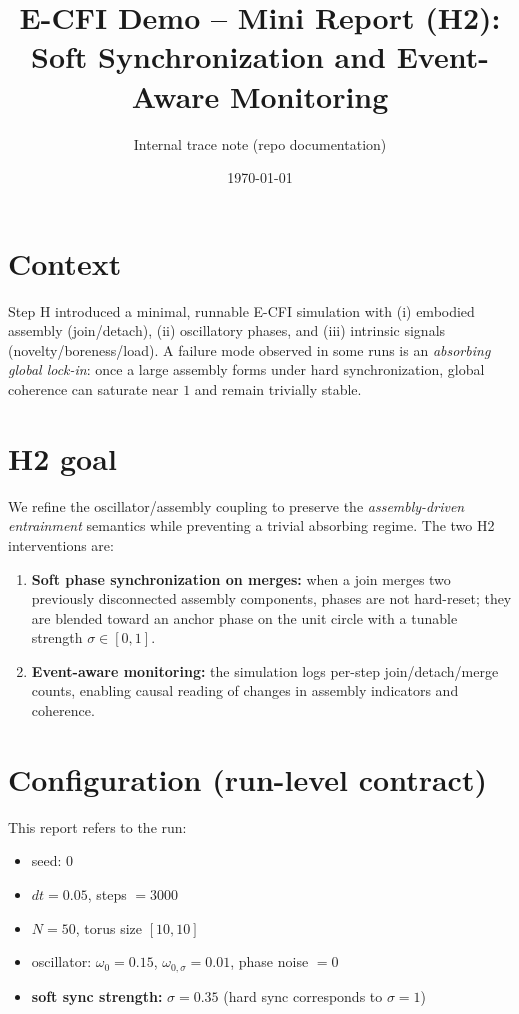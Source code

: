 \documentclass[11pt]{article}
\title{E-CFI Demo -- Mini Report (H2): Soft Synchronization and Event-Aware Monitoring}
\author{Internal trace note (repo documentation)}
\date{\today}
\begin{document}
\maketitle

\section{Context}
Step H introduced a minimal, runnable E-CFI simulation with (i) embodied assembly (join/detach), (ii) oscillatory phases, and
(iii) intrinsic signals (novelty/boreness/load). A failure mode observed in some runs is an \emph{absorbing global lock-in}:
once a large assembly forms under hard synchronization, global coherence can saturate near $1$ and remain trivially stable.

\section{H2 goal}
We refine the oscillator/assembly coupling to preserve the \emph{assembly-driven entrainment} semantics while preventing a trivial absorbing regime.
The two H2 interventions are:

\begin{enumerate}
\item \textbf{Soft phase synchronization on merges:} when a join merges two previously disconnected assembly components, phases are not hard-reset;
they are blended toward an anchor phase on the unit circle with a tunable strength $\sigma \in [0,1]$.
\item \textbf{Event-aware monitoring:} the simulation logs per-step join/detach/merge counts, enabling causal reading of changes in
assembly indicators and coherence.
\end{enumerate}

\section{Configuration (run-level contract)}
This report refers to the run:
\begin{itemize}
\item seed: 0
\item $dt = 0.05$, steps $= 3000$
\item $N=50$, torus size $[10,10]$
\item oscillator: $\omega_0 = 0.15$, $\omega_{0,\sigma} = 0.01$, phase noise $=0$
\item \textbf{soft sync strength:} $\sigma = 0.35$ (hard sync corresponds to $\sigma=1$)
\end{itemize}
\end{document}
